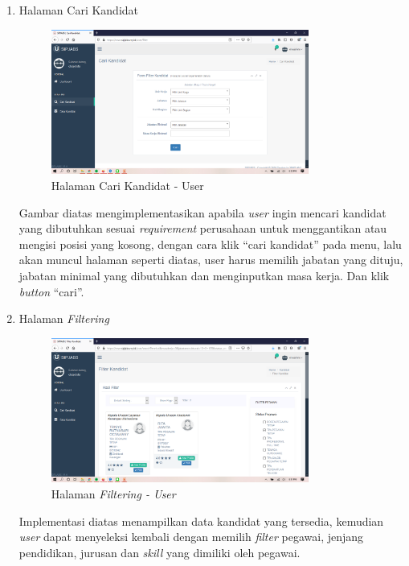 \begin{enumerate}
	\item Halaman Cari Kandidat
	\begin{figure}
		\centering
		\includegraphics[width=0.8\textwidth]
		{pics/user/implementasi/caritallent.png}
		\caption{Halaman Cari Kandidat - User}
		\label{fig:CC10}
	\end{figure}
	
	Gambar diatas mengimplementasikan apabila \textit{user} ingin mencari kandidat yang dibutuhkan sesuai \textit{requirement} perusahaan untuk menggantikan atau mengisi posisi yang kosong, dengan cara klik “cari kandidat” pada menu, lalu akan muncul halaman seperti diatas, user harus memilih jabatan yang dituju, jabatan  minimal yang dibutuhkan dan menginputkan masa kerja. Dan klik \textit{button} “cari”.
	
	\newpage
	\item Halaman \textit{Filtering}
	\begin{figure}
		\centering
		\includegraphics[width=0.8\textwidth]
		{pics/user/implementasi/hasiltallent.png}
		\caption{Halaman \textit{Filtering - User}}
		\label{fig:CC10}
	\end{figure}
	
	Implementasi diatas menampilkan data kandidat yang tersedia, kemudian \textit{user} dapat menyeleksi kembali dengan memilih \textit{filter} pegawai, jenjang pendidikan, jurusan dan \textit{skill} yang dimiliki oleh pegawai.
	

\end{enumerate}
